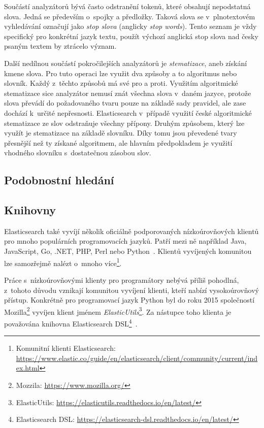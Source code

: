 Součástí analyzátorů bývá často odstranění tokenů, které obsahují nepodstatná slova. Jedná se především o~spojky a předložky. Taková slova se v~plnotextovém vyhledávání označují jako \emph{stop slova} (anglicky \emph{stop words}). Tento seznam je vždy specifický pro konkrétní jazyk textu, použít výchozí anglická stop slova nad česky psaným textem by ztrácelo význam.

Další nedílnou součástí pokročilejších analyzátorů je \emph{stematizace}, aneb získání kmene slova. Pro tuto operaci lze využit dva způsoby a to algoritmus nebo slovník. Každý z~těchto způsobů má své pro a proti.
Využitím algoritmické stematizace sice analyzátor nemusí znát všechna slova v~daném jazyce, protože slova převádí do požadovaného tvaru pouze na základě sady pravidel, ale zase dochází k~určité nepřesnosti. Elasticsearch v~případě využití české algoritmické stematizace ze slov odstraňuje všechny přípony.
Druhým způsobem, který lze využít je stematizace na základě slovníku. Díky tomu jsou převedené tvary přesnější než ty získané algoritmem, ale hlavním předpokladem je využití vhodného slovníku s~dostatečnou zásobou slov.

\subsection{Podobnostní hledání}
\blindtext[2]

\subsection{Knihovny}
Elasticsearch také vyvíjí několik oficiálně podporovaných nízkoúrovňových klientů pro mnoho populárních programovacích jazyků. Patří mezi ně například Java, JavaScript, Go, .NET, PHP, Perl nebo Python~\cite{bib:elastic-clients}.
Klientů vyvíjených komunitou lze samozřejmě nalézt o~mnoho více\footnote{Komunitní klienti Elasticsearch: \url{https://www.elastic.co/guide/en/elasticsearch/client/community/current/index.html}}.

Práce s~nízkoúrovňovými klienty pro programátory nebývá příliš pohodlná, z~tohoto důvodu vznikají komunitou vyvíjení klienti, kteří nabízí vysokoúrovňový přístup. Konkrétně pro programovací jazyk Python byl do roku 2015 společností Mozilla\footnote{Mozzila: \url{https://www.mozilla.org/}} vyvíjen klient jménem \emph{ElasticUtils}\footnote{ElasticUtils: \url{https://elasticutils.readthedocs.io/en/latest/}}. Za nástupce toho klienta je považována knihovna Elasticsearch DSL\footnote{Elasticsearch DSL: \url{https://elasticsearch-dsl.readthedocs.io/en/latest/}}~\cite{bib:elastic-utils}.

